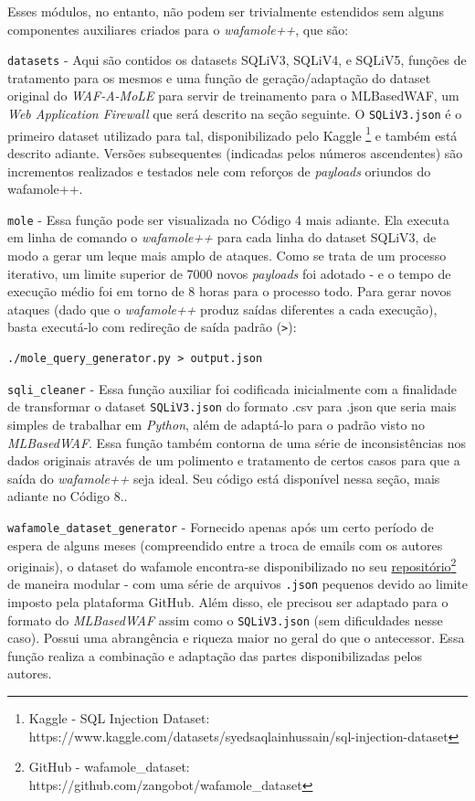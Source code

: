 Esses módulos, no entanto, não podem ser trivialmente estendidos sem alguns componentes auxiliares criados para o \textit{wafamole++}, que são:
\begin{alineas}
\item \verb+datasets+ - Aqui são contidos os datasets SQLiV3, SQLiV4, e SQLiV5, funções de tratamento para os mesmos e uma função de geração/adaptação do dataset original do \textit{WAF-A-MoLE} para servir de treinamento para o MLBasedWAF, um \textit{Web Application Firewall} que será descrito na seção seguinte. O \verb+SQLiV3.json+ é o primeiro dataset utilizado para tal, disponibilizado pelo Kaggle \footnote{Kaggle - SQL Injection Dataset: https://www.kaggle.com/datasets/syedsaqlainhussain/sql-injection-dataset} \cite{kaggle_dataset_sql} e também está descrito adiante. Versões subsequentes (indicadas pelos números ascendentes) são incrementos realizados e testados nele com reforços de \textit{payloads} oriundos do wafamole++.

\begin{alineas}
\item \verb+mole+ - Essa função pode ser visualizada no Código 4 mais adiante. Ela executa em linha de comando o \textit{wafamole++} para cada linha do dataset SQLiV3, de modo a gerar um leque mais amplo de ataques. Como se trata de um processo iterativo, um limite superior de 7000 novos \textit{payloads} foi adotado - e o tempo de execução médio foi em torno de 8 horas para o processo todo. Para gerar novos ataques (dado que o \textit{wafamole++} produz saídas diferentes a cada execução), basta executá-lo com redireção de saída padrão (\verb+>+):
\begin{verbatim}
./mole_query_generator.py > output.json
\end{verbatim}


\item \verb+sqli_cleaner+ - Essa função auxiliar foi codificada inicialmente com a finalidade de transformar o dataset \verb+SQLiV3.json+ do formato .csv para .json que seria mais simples de trabalhar em \textit{Python}, além de adaptá-lo para o padrão visto no \textit{MLBasedWAF}. Essa função também contorna de uma série de inconsistências nos dados originais através de um polimento e tratamento de certos casos para que a saída do \textit{wafamole++} seja ideal. Seu código está disponível nessa seção, mais adiante no Código 8..

\item \verb+wafamole_dataset_generator+ - Fornecido apenas após um certo período de espera de alguns meses (compreendido entre a troca de emails com os autores originais), o dataset do wafamole encontra-se disponibilizado no seu \href{https://github.com/zangobot/wafamole_dataset}{repositório}\footnote{GitHub - wafamole\_dataset: https://github.com/zangobot/wafamole_dataset} de maneira modular - com uma série de arquivos \verb+.json+ pequenos devido ao limite imposto pela plataforma GitHub. Além disso, ele precisou ser adaptado para o formato do \textit{MLBasedWAF} assim como o \verb+SQLiV3.json+ (sem dificuldades nesse caso). Possui uma abrangência e riqueza maior no geral do que o antecessor. Essa função realiza a combinação e adaptação das partes disponibilizadas pelos autores.


\end{alineas}
\end{alineas}
